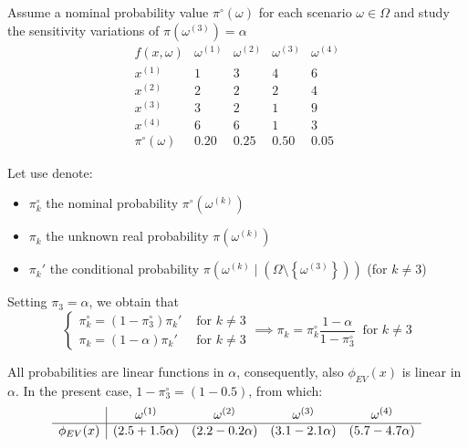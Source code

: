 Assume a nominal probability value $\pi^\circ (\omega)$ for each scenario $\omega \in \Omega$ and study the sensitivity variations of $\pi \left(\omega^{(3)}\right) = \alpha$
$$
\begin{array}{c|cccc }
	f(x,\omega) & \omega^{(1)} & \omega^{(2)} & \omega^{(3)} & \omega^{(4)}  \\
	\hline
	x^{(1)} & 1 & 3 & 4 & 6 \\
	x^{(2)} & 2 & 2 & 2 & 4 \\ 
	x^{(3)} & 3 & 2 & 1 & 9 \\
	x^{(4)} & 6 & 6 & 1 & 3 \\
	\hline
	\pi^\circ (\omega) & 0.20 & 0.25 & 0.50 & 0.05
\end{array}
$$

Let use denote: 
\begin{itemize}
	\item $\pi_k^\circ$ the nominal probability $\pi^\circ \left(\omega^{(k)}\right)$
	
	\item $\pi_k$ the unknown real probability $\pi\left(\omega^{(k)}\right)$
	
	\item $\pi_k'$ the conditional probability $\pi\left(\omega^{(k)} \mid \left(\Omega \setminus \left\{\omega^{(3)}\right\}\right)\right)$ (for $k \neq 3$)
\end{itemize}

Setting $\pi_3 = \alpha$, we obtain that
$$ 
\begin{cases}
	\pi_k^\circ = (1 - \pi_3^\circ) \pi_k' & \text{ for } k \neq 3 \\
	\pi_k = (1 - \alpha)\pi_k' & \text{ for } k \neq 3
\end{cases}
\implies \pi_k = \pi_k^\circ \frac{1 - \alpha}{1 - \pi_3^\circ} \ \text{ for } k \neq 3
$$

All probabilities are linear functions in $\alpha$, consequently, also $\phi_{EV} (x)$ is linear in $\alpha$. In the present case, $1 - \pi_3^\circ = (1 - 0.5)$, from which: 
$$
\begin{array}{c | c c c c}
	& \omega^{(1)} & \omega^{(2)} & \omega^{(3)} & \omega^{(4)} \\
	\hline
	\phi_{EV} (x) & (2.5 + 1.5\alpha) & (2.2 - 0.2\alpha) & (3.1 - 2.1\alpha) & (5.7 - 4.7 \alpha)
\end{array}
$$
\begin{center}
\end{center}

